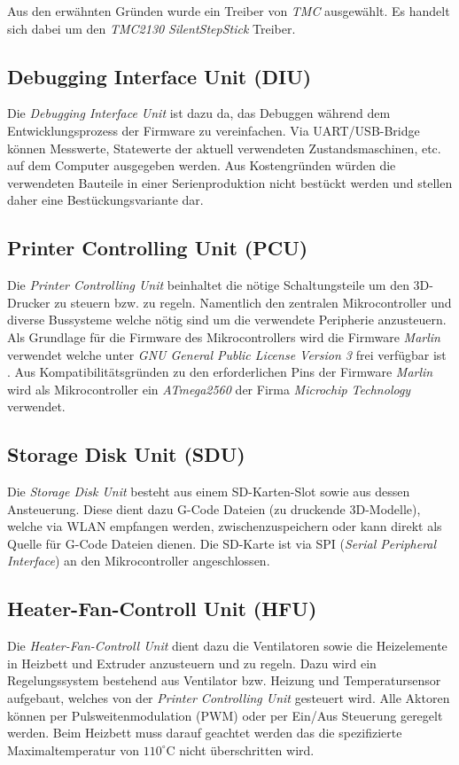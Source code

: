 Aus den erwähnten Gründen wurde ein Treiber von \textit{TMC} ausgewählt. Es handelt sich dabei um den \textit{TMC2130} \textit{SilentStepStick} Treiber. 

\subsection{Debugging Interface Unit (DIU)}\label{subsec:DIU}
Die \textit{Debugging Interface Unit} ist dazu da, das Debuggen während dem Entwicklungsprozess der Firmware zu vereinfachen. Via UART/USB-Bridge können Messwerte, Statewerte der aktuell verwendeten Zustandsmaschinen, etc. auf dem Computer ausgegeben werden. Aus Kostengründen würden die verwendeten Bauteile in einer Serienproduktion nicht bestückt werden und stellen daher eine Bestückungsvariante dar.

\subsection{Printer Controlling Unit (PCU)}\label{subsec:PCU}
Die \textit{Printer Controlling Unit} beinhaltet die nötige Schaltungsteile um den 3D-Drucker zu steuern bzw. zu regeln. Namentlich den zentralen Mikrocontroller und diverse Bussysteme welche nötig sind um die verwendete Peripherie anzusteuern. Als Grundlage für die Firmware des Mikrocontrollers wird die Firmware \textit{Marlin} verwendet \cite{marlin_webseite} welche unter \textit{GNU General Public License Version 3} frei verfügbar ist \cite{marlin_gnu_lizenz}. Aus Kompatibilitätsgründen zu den erforderlichen Pins der Firmware \textit{Marlin} wird als Mikrocontroller ein \textit{ATmega2560} \cite{ATmega2560_spezifiaktion} der Firma \textit{Microchip Technology} verwendet.

\subsection{Storage Disk Unit (SDU)}\label{subsec:SDU}
Die \textit{Storage Disk Unit} besteht aus einem SD-Karten-Slot sowie aus dessen Ansteuerung. Diese dient dazu G-Code Dateien (zu druckende 3D-Modelle), welche via WLAN empfangen werden, zwischenzuspeichern oder kann direkt als Quelle für G-Code Dateien dienen. Die SD-Karte ist via SPI (\textit{Serial Peripheral Interface}) an den Mikrocontroller angeschlossen. 

\subsection{Heater-Fan-Controll Unit (HFU)}\label{subsec:HFU}
Die \textit{Heater-Fan-Controll Unit} dient dazu die Ventilatoren sowie die Heizelemente in Heizbett und Extruder anzusteuern und zu regeln. Dazu wird ein Regelungssystem bestehend aus Ventilator bzw. Heizung und Temperatursensor aufgebaut, welches von der \textit{Printer Controlling Unit} gesteuert wird. Alle Aktoren können per Pulsweitenmodulation (PWM) oder per Ein/Aus Steuerung geregelt werden. Beim Heizbett muss darauf geachtet werden das die spezifizierte Maximaltemperatur von $110^\circ$C \cite{ender3_spezifiaktion} nicht überschritten wird.

